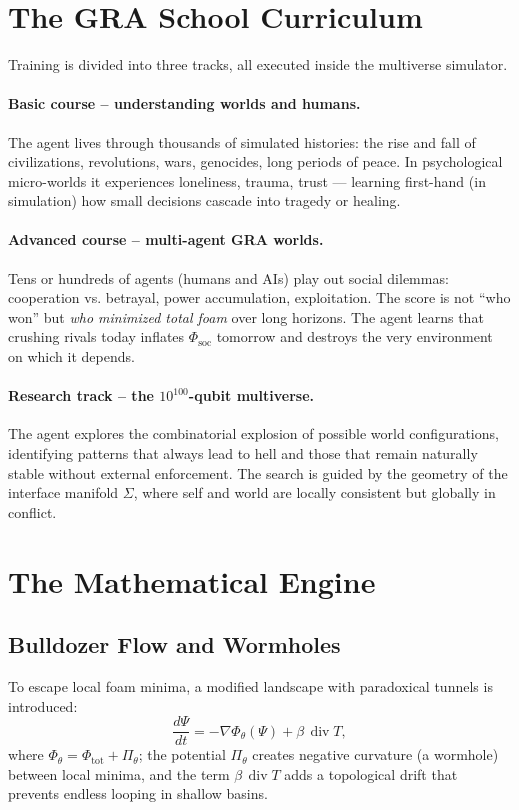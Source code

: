 \documentclass[a4paper,12pt]{article}
\begin{document}
\section{The GRA School Curriculum}

Training is divided into three tracks, all executed inside the multiverse simulator.

\paragraph{Basic course – understanding worlds and humans.}
The agent lives through thousands of simulated histories: the rise and fall of civilizations, revolutions, wars, genocides, long periods of peace. In psychological micro-worlds it experiences loneliness, trauma, trust — learning first-hand (in simulation) how small decisions cascade into tragedy or healing.

\paragraph{Advanced course – multi-agent GRA worlds.}
Tens or hundreds of agents (humans and AIs) play out social dilemmas: cooperation vs. betrayal, power accumulation, exploitation. The score is not “who won” but \emph{who minimized total foam} over long horizons. The agent learns that crushing rivals today inflates $\Phi_{\text{soc}}$ tomorrow and destroys the very environment on which it depends.

\paragraph{Research track – the $10^{100}$-qubit multiverse.}
The agent explores the combinatorial explosion of possible world configurations, identifying patterns that always lead to hell and those that remain naturally stable without external enforcement. The search is guided by the geometry of the interface manifold $\Sigma$, where self and world are locally consistent but globally in conflict.

\section{The Mathematical Engine}
\subsection{Bulldozer Flow and Wormholes}
To escape local foam minima, a modified landscape with paradoxical tunnels is introduced:
\begin{equation}\label{eq:bulldozer}
\frac{d\Psi}{dt} = -\nabla \Phi_\theta(\Psi) + \beta\,\operatorname{div} T,
\end{equation}
where $\Phi_\theta = \Phi_{\text{tot}} + \Pi_\theta$; the potential $\Pi_\theta$ creates negative curvature (a wormhole) between local minima, and the term $\beta\,\operatorname{div} T$ adds a topological drift that prevents endless looping in shallow basins.
\end{document}
